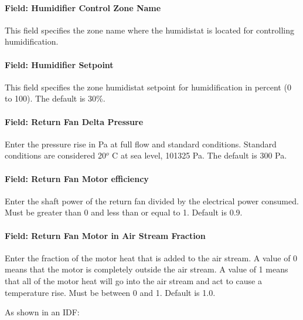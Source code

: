 \paragraph{Field: Humidifier Control Zone Name}\label{field-humidifier-control-zone-name}

This field specifies the zone name where the humidistat is located for controlling humidification.

\paragraph{Field: Humidifier Setpoint}\label{field-humidifier-setpoint}

This field specifies the zone humidistat setpoint for humidification in percent (0 to 100). The default is 30\%.

\paragraph{Field: Return Fan Delta Pressure}\label{field-return-fan-delta-pressure}

Enter the pressure rise in Pa at full flow and standard conditions. Standard conditions are considered 20\(^{o}\) C at sea level, 101325 Pa. The default is 300 Pa.

\paragraph{Field: Return Fan Motor efficiency}\label{field-return-fan-motor-efficiency}

Enter the shaft power of the return fan divided by the electrical power consumed. Must be greater than 0 and less than or equal to 1. Default is 0.9.

\paragraph{Field: Return Fan Motor in Air Stream Fraction}\label{field-return-fan-motor-in-air-stream-fraction}

Enter the fraction of the motor heat that is added to the air stream. A value of 0 means that the motor is completely outside the air stream. A value of 1 means that all of the motor heat will go into the air stream and act to cause a temperature rise. Must be between 0 and 1. Default is 1.0.

As shown in an IDF:

